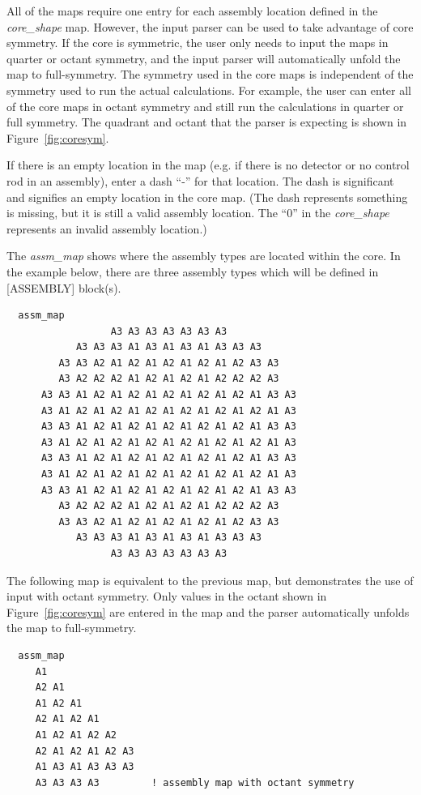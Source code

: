 All of the maps require one entry for each assembly location defined in the {\it core\_shape} map.
However, the input parser can be used to take advantage of core symmetry.  If the core is symmetric,
the user only needs to input the maps in quarter or octant symmetry, and the input parser will automatically
unfold the map to full-symmetry.
The symmetry used in the core maps is independent of the symmetry used to run the actual calculations.
For example, the user can enter all of the core maps in octant symmetry and still run the calculations
in quarter or full symmetry.
The quadrant and octant that the parser is expecting is shown in Figure~\ref{fig:coresym}.

If there is an empty location in the map (e.g. if there is no detector or no control rod
in an assembly), enter a dash ``-'' for that location.  The dash is significant and signifies an
empty location in the core map.  (The dash represents something is missing, but it is still
a valid assembly location. The ``0'' in the {\it core\_shape} represents an invalid assembly location.)


\clearpage

The {\it assm\_map} shows where the assembly types are located within the core.
In the example below, there are three assembly types which will be defined in [ASSEMBLY] block(s).
\begin{verbatim}
  assm_map
                  A3 A3 A3 A3 A3 A3 A3
            A3 A3 A3 A1 A3 A1 A3 A1 A3 A3 A3
         A3 A3 A2 A1 A2 A1 A2 A1 A2 A1 A2 A3 A3
         A3 A2 A2 A2 A1 A2 A1 A2 A1 A2 A2 A2 A3
      A3 A3 A1 A2 A1 A2 A1 A2 A1 A2 A1 A2 A1 A3 A3
      A3 A1 A2 A1 A2 A1 A2 A1 A2 A1 A2 A1 A2 A1 A3
      A3 A3 A1 A2 A1 A2 A1 A2 A1 A2 A1 A2 A1 A3 A3
      A3 A1 A2 A1 A2 A1 A2 A1 A2 A1 A2 A1 A2 A1 A3
      A3 A3 A1 A2 A1 A2 A1 A2 A1 A2 A1 A2 A1 A3 A3
      A3 A1 A2 A1 A2 A1 A2 A1 A2 A1 A2 A1 A2 A1 A3
      A3 A3 A1 A2 A1 A2 A1 A2 A1 A2 A1 A2 A1 A3 A3
         A3 A2 A2 A2 A1 A2 A1 A2 A1 A2 A2 A2 A3
         A3 A3 A2 A1 A2 A1 A2 A1 A2 A1 A2 A3 A3
            A3 A3 A3 A1 A3 A1 A3 A1 A3 A3 A3
                  A3 A3 A3 A3 A3 A3 A3
\end{verbatim}

The following map is equivalent to the previous map, but demonstrates the use of input with octant symmetry.
Only values in the octant shown in Figure~\ref{fig:coresym} are entered in the map and the parser automatically
unfolds the map to full-symmetry.
\begin{verbatim}
  assm_map
     A1
     A2 A1
     A1 A2 A1
     A2 A1 A2 A1
     A1 A2 A1 A2 A2
     A2 A1 A2 A1 A2 A3
     A1 A3 A1 A3 A3 A3
     A3 A3 A3 A3         ! assembly map with octant symmetry
\end{verbatim}

